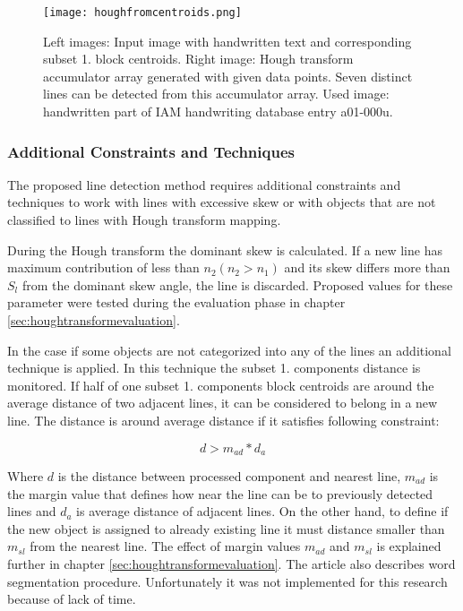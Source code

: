 \documentclass{article}
\begin{document}
            \begin{figure}[!ht]
              \centering
              \texttt{[image: houghfromcentroids.png]}
              \caption{Left images: Input image with handwritten text and corresponding subset 1. block centroids. Right image: Hough transform accumulator array generated with given data points. Seven distinct lines can be detected from this accumulator array. Used image: handwritten part of IAM handwriting database entry a01-000u. \label{fig:blockandacc} }
            \end{figure}

          \subsubsection{Additional Constraints and Techniques}
            The proposed line detection method requires additional constraints and techniques to work with lines with excessive skew or with objects that are not classified to lines with Hough transform mapping.

            During the Hough transform the dominant skew is calculated. If a new line has maximum contribution of less than $n_2 (n_2 > n_1)$ and its skew differs more than $S_l$ from the dominant skew angle, the line is discarded. Proposed values for these parameter were tested during the evaluation phase in chapter \ref{sec:houghtransformevaluation}.

            In the case if some objects are not categorized into any of the lines an additional technique is applied. In this technique the subset 1. components distance is monitored. If half of one subset 1. components block centroids are around the average distance of two adjacent lines, it can be considered to belong in a new line. The distance is around average distance if it satisfies following constraint:

            \begin{equation}
              d >  m_{ad}*d_a
            \end{equation}

            Where $d$ is the distance between processed component and nearest line, $m_{ad}$ is the margin value that defines how near the line can be to previously detected lines and $d_a$ is average distance of adjacent lines. On the other hand, to define if the new object is assigned to already existing line it must distance smaller than $m_{sl}$ from the nearest line. The effect of margin values $m_{ad}$ and $m_{sl}$ is explained further in chapter \ref{sec:houghtransformevaluation}. The article \cite{Louloudis2} also describes word segmentation procedure. Unfortunately it was not implemented for this research because of lack of time.
\end{document}
